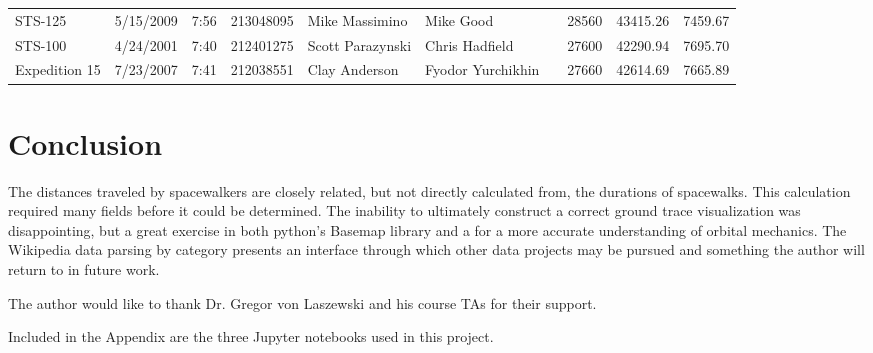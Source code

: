 \documentclass[sigconf]{acmart}
\begin{document}
\begin{table}[]
\begin{tabular}{llllllllll}
		STS-125          & 5/15/2009     & 7:56              & 213048095                              & Mike Massimino     & Mike Good            &                 & 28560                                 & 43415.26                   & 7459.67                   \\
		STS-100          & 4/24/2001     & 7:40              & 212401275                              & Scott Parazynski   & Chris Hadfield       &                 & 27600                                 & 42290.94                   & 7695.70                   \\
		Expedition 15    & 7/23/2007     & 7:41              & 212038551                              & Clay Anderson      & Fyodor Yurchikhin    &                 & 27660                                 & 42614.69                   & 7665.89                  
\end{tabular}
\end{table}

 

\section{Conclusion}
The distances traveled by spacewalkers are closely related, but not directly calculated from, the durations of spacewalks. This calculation required many fields before it could be determined. The inability to ultimately construct a correct ground trace visualization was disappointing, but a great exercise in both python's Basemap library and a for a more accurate understanding of orbital mechanics. The Wikipedia data parsing by category presents an interface through which other data projects may be pursued and something the author will return to in future work. 



\begin{acks}
	
  The author would like to thank Dr. Gregor von Laszewski and his course TAs for their support.
  
\end{acks}


 

\appendix

Included in the Appendix are the three Jupyter notebooks used in this project.


\end{document}
